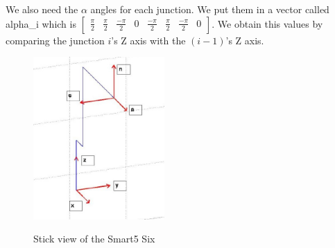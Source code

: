 \documentclass[english,a4paper,11pt]{report}
\begin{document}
	We also need the $\alpha$ angles for each junction. We put them in a vector called alpha\_i which is $\begin{bmatrix}\frac{\pi}{2} & \frac{\pi}{2} & \frac{-\pi}{2} & 0 & \frac{-\pi}{2} & \frac{\pi}{2} & \frac{-\pi}{2} & 0\end{bmatrix}$. We obtain this values by comparing the junction $i$\rq{}s Z axis with the $(i-1)$\rq{}s Z axis.
	
	
	\begin{figure}[h]
	\center
		\includegraphics[width=5cm]{images_not_compressed/alphaAngles.png}
		\label{alpha}
		\caption{Stick view of the Smart5 Six}
	\end{figure}

	\listoffigures
	
\end{document}
